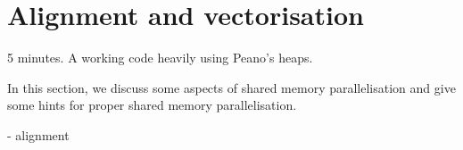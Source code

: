 \section{Alignment and vectorisation}

\chapterDescription
  {
    5 minutes.
  }
  {
    A working code heavily using Peano's heaps.
  }


In this section, we discuss some aspects of shared memory parallelisation and
give some hints for proper shared memory parallelisation.



- alignment



%
%



% 
% 

